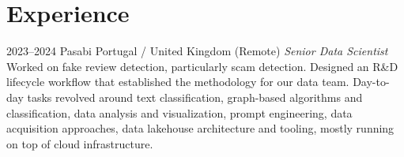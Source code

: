 \documentclass{friggeri-cv}
\begin{document}

\section{Experience}

\begin{entrylist}
\entry
{2023--2024}
{Pasabi}
{Portugal / United Kingdom (Remote)}
{\emph{Senior Data Scientist}\\[-.5em]

Worked on fake review detection, particularly scam detection. Designed an R\&D lifecycle workflow that established the methodology for our data team. Day-to-day tasks revolved around text classification, graph-based algorithms and classification, data analysis and visualization, prompt engineering, data acquisition approaches, data lakehouse architecture and tooling, mostly running on top of cloud infrastructure.}
\end{entrylist}
\end{document}
